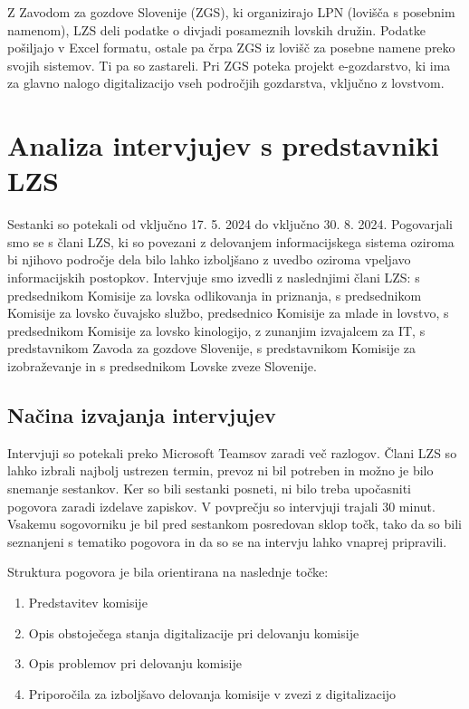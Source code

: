 \documentclass[a4paper,12pt,openright]{book}
\begin{document}
Z Zavodom za gozdove Slovenije (ZGS), ki organizirajo LPN (lovišča s posebnim namenom), LZS deli podatke o divjadi posameznih lovskih družin.
Podatke pošiljajo v Excel formatu, ostale pa črpa ZGS iz lovišč za posebne namene preko svojih sistemov. 
Ti pa so zastareli.
Pri ZGS poteka projekt e-gozdarstvo, ki ima za glavno nalogo digitalizacijo vseh področjih gozdarstva, vključno z lovstvom.





\chapter{Analiza intervjujev s predstavniki LZS}
\label{analiza_intervjujev}

Sestanki so potekali od vključno 17. 5. 2024 do vključno 30. 8. 2024. 
Pogovarjali smo se s člani LZS, ki so povezani z delovanjem informacijskega sistema oziroma bi njihovo področje dela bilo lahko izboljšano z uvedbo oziroma vpeljavo informacijskih postopkov.
Intervjuje smo izvedli z naslednjimi člani LZS: s predsednikom Komisije za lovska odlikovanja in priznanja, s predsednikom Komisije za lovsko čuvajsko službo, predsednico Komisije za mlade in lovstvo, s predsednikom Komisije za lovsko kinologijo, z zunanjim izvajalcem za IT, s predstavnikom Zavoda za gozdove Slovenije, s predstavnikom Komisije za izobraževanje in s predsednikom Lovske zveze Slovenije. 

\section{Načina izvajanja intervjujev}

Intervjuji so potekali preko Microsoft Teamsov zaradi več razlogov. 
Člani LZS so lahko izbrali najbolj ustrezen termin, prevoz ni bil potreben in možno je bilo snemanje sestankov.
Ker so bili sestanki posneti, ni bilo treba upočasniti pogovora zaradi izdelave zapiskov.
V povprečju so intervjuji trajali 30 minut.
Vsakemu sogovorniku je bil pred sestankom posredovan sklop točk, tako da so bili seznanjeni s tematiko pogovora in da so se na intervju lahko vnaprej pripravili. 

Struktura pogovora je bila orientirana na naslednje točke:
\begin{enumerate}
    \item Predstavitev komisije
    \item Opis obstoječega stanja digitalizacije pri delovanju komisije
    \item Opis problemov pri delovanju komisije
    \item Priporočila za izboljšavo delovanja komisije v zvezi z digitalizacijo
\end{enumerate}
\end{document}
